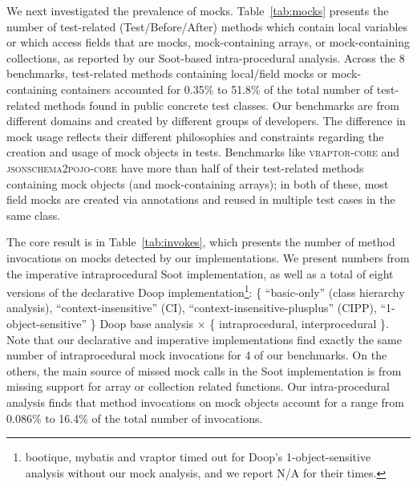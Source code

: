 We next investigated the prevalence of mocks. Table~\ref{tab:mocks} presents the number of test-related (Test/Before/After) methods which contain local variables or which access fields that are mocks, mock-containing arrays, or mock-containing collections, as reported by our Soot-based intra-procedural analysis. Across the 8 benchmarks, test-related methods containing local/field mocks or mock-containing containers accounted for 0.35\% to 51.8\% of the total number of test-related methods found in public concrete test classes. Our benchmarks are from different domains and created by different groups of developers. The difference in mock usage reflects their different philosophies and constraints regarding the creation and usage of mock objects in tests. Benchmarks like \textsc{vraptor-core} and \textsc{jsonschema2pojo-core} have more than half of their test-related methods containing mock objects (and mock-containing arrays); in both of these, most field mocks are created via annotations and reused in multiple test cases in the same class.

The core result is in Table~\ref{tab:invokes}, which presents the number of method invocations on mocks detected by our implementations. We present numbers from the imperative intraprocedural Soot implementation, as well as a total of eight versions of the declarative Doop implementation\footnote{bootique, mybatis and vraptor timed out for Doop's 1-object-sensitive analysis without our mock analysis, and we report N/A for their times.}: \{ ``basic-only'' (class hierarchy analysis), ``context-insensitive'' (CI), ``context-insensitive-plusplus'' (CIPP), ``1-object-sensitive'' \} Doop base analysis $\times$ \{ intraprocedural, interprocedural \}. Note that our declarative and imperative implementations find exactly the same number of intraprocedural mock invocations for 4 of our benchmarks. On the others, the main source of missed mock calls in the Soot implementation is from missing support for array or collection related functions. Our intra-procedural analysis finds that method invocations on mock objects account for a range from 0.086\% to 16.4\% of the total number of invocations. 


